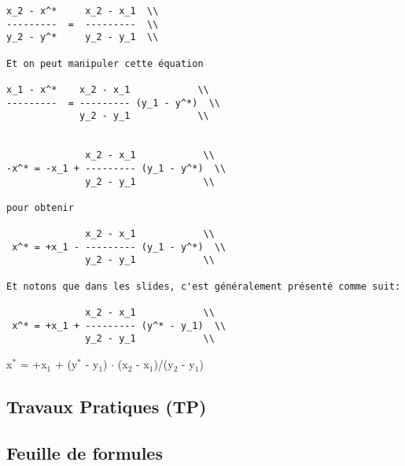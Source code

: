 \documentclass[11pt]{article}
\begin{document}
\begin{verbatim}
x_2 - x^*     x_2 - x_1  \\
---------  =  ---------  \\
y_2 - y^*     y_2 - y_1  \\

Et on peut manipuler cette équation

x_1 - x^*    x_2 - x_1            \\
---------  = --------- (y_1 - y^*)  \\
             y_2 - y_1            \\


              x_2 - x_1            \\
-x^* = -x_1 + --------- (y_1 - y^*)  \\
              y_2 - y_1            \\

pour obtenir

              x_2 - x_1            \\
 x^* = +x_1 - --------- (y_1 - y^*)  \\
              y_2 - y_1            \\

Et notons que dans les slides, c'est généralement présenté comme suit:

              x_2 - x_1            \\
 x^* = +x_1 + --------- (y^* - y_1)  \\
              y_2 - y_1            \\
\end{verbatim}

x\(^{\text{*}}\) = +x\(_{\text{1}}\) + (y\(^{\text{*}}\) - y\(_{\text{1}}\)) \(\cdot\) (x\(_{\text{2}}\) - x\(_{\text{1}}\))/(y\(_{\text{2}}\) - y\(_{\text{1}}\)) \\

\subsection{Travaux Pratiques (TP)}
\label{sec:org4a8034a}


\subsection{Feuille de formules}
\label{sec:org32445f2}
\end{document}
